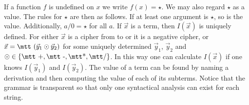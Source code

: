 If a function $f$ is undefined on $x$ we write $f(x) = \star$.
We may also regard $\star$ as a value. The rules for $\star$
are then as follows. If at least one argument is $\star$, so is the value.
Additionally, $a / 0 = \star$ for all $a$. If $\vec{x}$ is a
term, then $I(\vec{x})$ is uniquely defined. For either $\vec{x}$
is a cipher from {} to {} or it is a negative cipher,
or $\vec{x} = \mbox{\mtt ($\vec{y}_1\odot\vec{y}_2$)}$ for some 
uniquely determined $\vec{y}_1$, $\vec{y}_2$ and 
$\odot \in \{\mbox{\mtt +}, \mbox{\mtt -}, \mbox{\mtt\symbol{42}}, 
\mbox{\mtt\symbol{47}}\}$. In this way one can calculate $I(\vec{x})$ 
if one knows $I(\vec{y}_1)$ and $I(\vec{y}_2)$. The value of a term 
can be found by naming a derivation and then computing the value of 
each of its subterms. Notice that the grammar is transparent so that 
only one syntactical analysis can exist for each string.

